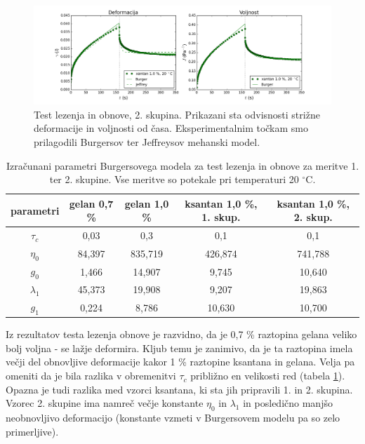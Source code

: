 \documentclass{article}
\begin{document}
\begin{figure}[H]
  \centering
  \includegraphics[width=\linewidth]{S2creep.png}
  \caption{Test lezenja in obnove, 2. skupina. Prikazani sta odvisnosti strižne deformacije in voljnosti od časa. Eksperimentalnim točkam smo prilagodili Burgersov ter Jeffreysov mehanski model.}
  \label{fig:creep2}
\end{figure}

\renewcommand{\arraystretch}{1.2}
\begin{table}[H]
\centering
\caption{Izračunani parametri Burgersovega modela za test lezenja in obnove za meritve 1. ter 2. skupine. Vse meritve so potekale pri temperaturi 20 $^\circ$C.}
\label{tab:creep}
\begin{tabular}{ccccc}
\toprule
   parametri & gelan 0,7 \% & gelan 1,0 \% & ksantan 1,0 \%, 1. skup. & ksantan 1,0 \%, 2. skup. \\ 
   \midrule
   $\tau_c$    & 0,03   & 0,3     & 0,1     & 0,1     \\ 
   \hline
   $\eta_0$    & 84,397 & 835,719 & 426,874 & 741,788 \\
   $g_0$       & 1,466  & 14,907  & 9,745   & 10,640  \\
   $\lambda_1$ & 45,373 & 19,908  & 9,207   & 19,863  \\
   $g_1$       & 0,224  & 8,786   & 10,630  & 10,700  \\
   \bottomrule
\end{tabular}
\end{table}

Iz rezultatov testa lezenja obnove je razvidno, da je 0,7 \% raztopina gelana veliko bolj voljna - se lažje deformira. Kljub temu je zanimivo, da je ta raztopina imela večji del obnovljive deformacije kakor 1 \% raztopine ksantana in gelana. Velja pa omeniti da je bila razlika v obremenitvi $\tau_c$ približno en velikosti red (tabela \ref{tab:creep}). Opazna je tudi razlika med vzorci ksantana, ki sta jih pripravili 1. in 2. skupina. Vzorec 2. skupine ima namreč večje konstante $\eta_0$ in $\lambda_1$ in posledično manjšo neobnovljivo deformacijo (konstante vzmeti v Burgersovem modelu pa so zelo primerljive).
\end{document}
